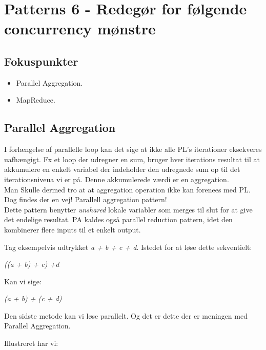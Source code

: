 \section{Patterns 6 - Redegør for følgende concurrency mønstre}

\subsection{Fokuspunkter}

\begin{itemize}
	\item Parallel Aggregation.
	\item MapReduce.
\end{itemize}

\subsection{Parallel Aggregation}
I forlængelse af parallelle loop kan det sige at ikke alle PL's iterationer eksekveres uafhængigt. Fx et loop der udregner en sum, bruger hver iterations resultat til at akkumulere en enkelt variabel der indeholder den udregnede sum op til det iterationsniveua vi er på. Denne akkumulerede værdi er en aggregation.\\

Man Skulle dermed tro at at aggregation operation ikke kan forenees med PL. Dog findes der en vej! Parallell aggregation pattern!\\

Dette pattern benytter \textit{unshared} lokale variabler som merges til slut for at give det endelige resultat. PA kaldes også parallel reduction pattern, idet den kombinerer flere inputs til et enkelt output.

Tag eksempelvis udtrykket \textit{a + b + c + d}. Istedet for at løse dette sekventielt:

\textit{((a + b) + c) +d}

Kan vi sige:

\textit{(a + b) + (c + d)}

Den sidste metode kan vi løse parallelt. Og det er dette der er meningen med Parallel Aggregation.

Illustreret har vi:


